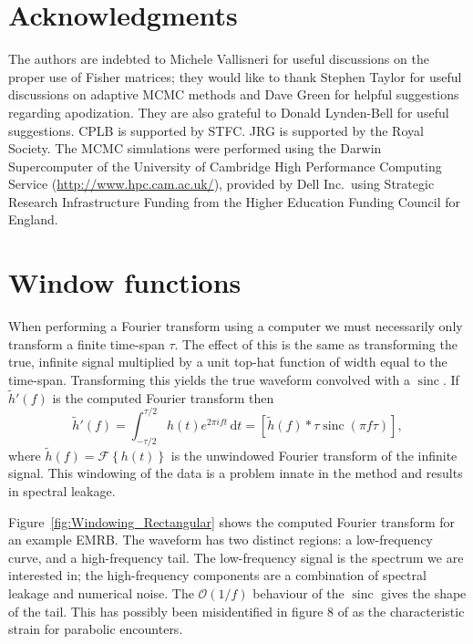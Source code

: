 \documentclass[useAMS,usedcolumn,usegraphicx,usenatbib]{mn2e}
\newcommand{\Figref}[1]{Figure~\ref{fig:#1}}
\DeclareMathOperator{\sinc}{sinc}
\newcommand{\dd}{\ensuremath{\mathrm{d}}}
\newcommand{\intd}[4]{\ensuremath{\int_{#1}^{#2}{#3}\,\dd{#4}}}
\newcommand{\order}[1]{\ensuremath{\mathcal{O}({#1})}}
\begin{document}
\section*{Acknowledgments}

The authors are indebted to Michele Vallisneri for useful discussions on the proper use of Fisher matrices; they would like to thank Stephen Taylor for useful discussions on adaptive MCMC methods and Dave Green for helpful suggestions regarding apodization. They are also grateful to Donald Lynden-Bell for useful suggestions. CPLB is supported by STFC. JRG is supported by the Royal Society. The MCMC simulations were performed using the Darwin Supercomputer of the University of Cambridge High Performance Computing Service (\url{http://www.hpc.cam.ac.uk/}), provided by Dell Inc.\ using Strategic Research Infrastructure Funding from the Higher Education Funding Council for England. 




\appendix

\section{Window functions}\label{ap:window}

When performing a Fourier transform using a computer we must necessarily only transform a finite time-span $\tau$. The effect of this is the same as transforming the true, infinite signal multiplied by a unit top-hat function of width equal to the time-span. Transforming this yields the true waveform convolved with a $\sinc$. If $\tilde{h}'(f)$ is the computed Fourier transform then
\begin{equation}
\tilde{h}'(f) = \intd{-\tau/2}{\tau/2}{h(t)e^{2\pi i ft}}{t} = \left[\tilde{h}(f) \ast \tau \sinc(\pi f\tau)\right],
\end{equation}
where $\tilde{h}(f) = \mathscr{F}\left\{h(t)\right\}$ is the unwindowed Fourier transform of the infinite signal. This windowing of the data is a problem innate in the method and results in spectral leakage.

\Figref{Windowing_Rectangular} shows the computed Fourier transform for an example EMRB. The waveform has two distinct regions: a low-frequency curve, and a high-frequency tail. The low-frequency signal is the spectrum we are interested in; the high-frequency components are a combination of spectral leakage and numerical noise. The $\order{1/{f}}$ behaviour of the $\sinc$ gives the shape of the tail. This has possibly been misidentified in figure 8 of \citet{Burko2007} as the characteristic strain for parabolic encounters.
\end{document}

